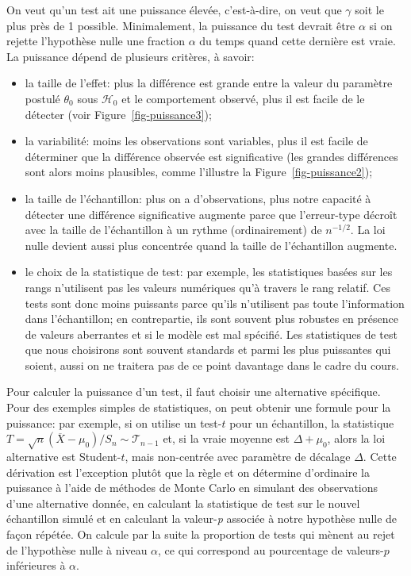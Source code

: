 \documentclass[
  11pt,
  letterpaper,
]{scrbook}
\providecommand{\tightlist}{%
  \setlength{\itemsep}{0pt}\setlength{\parskip}{0pt}}\usepackage{longtable,booktabs,array}
\theoremstyle{definition}
\theoremstyle{definition}
\theoremstyle{remark}
\begin{document}
On veut qu'un test ait une puissance élevée, c'est-à-dire, on veut que
\(\gamma\) soit le plus près de 1 possible. Minimalement, la puissance
du test devrait être \(\alpha\) si on rejette l'hypothèse nulle une
fraction \(\alpha\) du temps quand cette dernière est vraie. La
puissance dépend de plusieurs critères, à savoir:

\begin{itemize}
\tightlist
\item
  la taille de l'effet: plus la différence est grande entre la valeur du
  paramètre postulé \(\theta_0\) sous \(\mathscr{H}_0\) et le
  comportement observé, plus il est facile de le détecter (voir
  Figure~\ref{fig-puissance3});
\item
  la variabilité: moins les observations sont variables, plus il est
  facile de déterminer que la différence observée est significative (les
  grandes différences sont alors moins plausibles, comme l'illustre la
  Figure~\ref{fig-puissance2});
\item
  la taille de l'échantillon: plus on a d'observations, plus notre
  capacité à détecter une différence significative augmente parce que
  l'erreur-type décroît avec la taille de l'échantillon à un rythme
  (ordinairement) de \(n^{-1/2}\). La loi nulle devient aussi plus
  concentrée quand la taille de l'échantillon augmente.
\item
  le choix de la statistique de test: par exemple, les statistiques
  basées sur les rangs n'utilisent pas les valeurs numériques qu'à
  travers le rang relatif. Ces tests sont donc moins puissants parce
  qu'ils n'utilisent pas toute l'information dans l'échantillon; en
  contrepartie, ils sont souvent plus robustes en présence de valeurs
  aberrantes et si le modèle est mal spécifié. Les statistiques de test
  que nous choisirons sont souvent standards et parmi les plus
  puissantes qui soient, aussi on ne traitera pas de ce point davantage
  dans le cadre du cours.
\end{itemize}

Pour calculer la puissance d'un test, il faut choisir une alternative
spécifique. Pour des exemples simples de statistiques, on peut obtenir
une formule pour la puissance: par exemple, si on utilise un test-\(t\)
pour un échantillon, la statistique
\(T=\sqrt{n}(\overline{X}-\mu_0)/S_n \sim \mathcal{T}_{n-1}\) et, si la
vraie moyenne est \(\Delta + \mu_0\), alors la loi alternative est
Student-\(t\), mais non-centrée avec paramètre de décalage \(\Delta\).
Cette dérivation est l'exception plutôt que la règle et on détermine
d'ordinaire la puissance à l'aide de méthodes de Monte Carlo en simulant
des observations d'une alternative donnée, en calculant la statistique
de test sur le nouvel échantillon simulé et en calculant la
valeur-\emph{p} associée à notre hypothèse nulle de façon répétée. On
calcule par la suite la proportion de tests qui mènent au rejet de
l'hypothèse nulle à niveau \(\alpha\), ce qui correspond au pourcentage
de valeurs-\(p\) inférieures à \(\alpha\).
\end{document}
